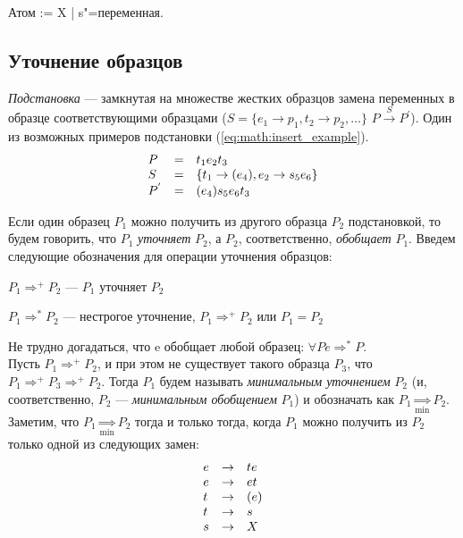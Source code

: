 \documentclass[12pt]{article}
\begin{document}
Атом := X | s"=переменная.

\subsection[Уточнение образцов]{\large Уточнение образцов}
\hspace{\parindent} \textit{Подстановка} --- замкнутая на множестве жестких образцов замена переменных в образце соответствующими образцами ($S = \{ e_1 \to p_1, t_2 \to p_2, \ldots \} $ $ P \xrightarrow{S} P^{'} $). Один из возможных примеров подстановки (\ref{eq:math:insert_example}). 
\begin{equation}\label{eq:math:insert_example}
\begin{array}{l l l}
P & = & t_1 e_2 t_3 \\
S & = & \{ t_1 \to (e_4), e_2 \to s_5 e_6 \} \\
P^{'} & = & (e_4) s_5 e_6 t_3
\end{array}
\end{equation} 

\indent Если один образец \(P_1\) можно получить из другого образца \(P_2\) подстановкой, то будем говорить, что \(P_1\) \textit{уточняет} \(P_2\), а \(P_2\), соответственно, \textit{обобщает} \(P_1\).  Введем следующие обозначения для операции уточнения образцов:

\(P_1 \Rightarrow^+ P_2\) --- $P_1$ уточняет $P_2$

\(P_1 \Rightarrow^* P_2\) --- нестрогое уточнение, $P_1 \Rightarrow^+ P_2$ или $P_1 = P_2$

\indent Не трудно догадаться, что e обобщает любой образец: $\forall P e \Rightarrow^* P$.\\
\indent Пусть \(P_1 \Rightarrow^+ P_2\), и при этом не существует такого образца \(P_3\), что \(P_1 \Rightarrow^+ P_3 \Rightarrow^+ P_2\). Тогда \(P_1\) будем называть \textit{минимальным уточнением} \(P_2\) (и, соответственно, \(P_2\) --- \textit{минимальным обобщением} \(P_1\)) и обозначать как \(P_1 \underset{\scriptscriptstyle\min}{\Rightarrow} P_2\).\\
\indent Заметим, что \(P_1 \underset{\scriptscriptstyle\min}{\Rightarrow} P_2\) тогда и только тогда, когда \(P_1\) можно получить из \(P_2\) только одной из следующих замен:
\begin{equation}\label{eq:math:simpletransform}
\begin{array}{l l l}
e & \to & te \\
e & \to & et \\
t & \to & (e) \\
t & \to & s \\
s & \to & X
\end{array}
\end{equation}
\end{document}
